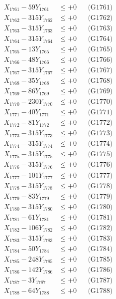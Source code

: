\documentclass[a4paper,10pt]{article}
\begin{document}
{\begin{align}
\allowbreak
X_{1761} - 59Y_{1761} &\leq +0 && \text{(G1761)} \\
X_{1762} - 315Y_{1762} &\leq +0 && \text{(G1762)} \\
X_{1763} - 315Y_{1763} &\leq +0 && \text{(G1763)} \\
X_{1764} - 315Y_{1764} &\leq +0 && \text{(G1764)} \\
X_{1765} - 13Y_{1765} &\leq +0 && \text{(G1765)} \\
X_{1766} - 48Y_{1766} &\leq +0 && \text{(G1766)} \\
X_{1767} - 315Y_{1767} &\leq +0 && \text{(G1767)} \\
X_{1768} - 35Y_{1768} &\leq +0 && \text{(G1768)} \\
X_{1769} - 86Y_{1769} &\leq +0 && \text{(G1769)} \\
X_{1770} - 230Y_{1770} &\leq +0 && \text{(G1770)} \\
\allowbreak
X_{1771} - 40Y_{1771} &\leq +0 && \text{(G1771)} \\
X_{1772} - 81Y_{1772} &\leq +0 && \text{(G1772)} \\
X_{1773} - 315Y_{1773} &\leq +0 && \text{(G1773)} \\
X_{1774} - 315Y_{1774} &\leq +0 && \text{(G1774)} \\
X_{1775} - 315Y_{1775} &\leq +0 && \text{(G1775)} \\
X_{1776} - 315Y_{1776} &\leq +0 && \text{(G1776)} \\
X_{1777} - 101Y_{1777} &\leq +0 && \text{(G1777)} \\
X_{1778} - 315Y_{1778} &\leq +0 && \text{(G1778)} \\
X_{1779} - 83Y_{1779} &\leq +0 && \text{(G1779)} \\
X_{1780} - 315Y_{1780} &\leq +0 && \text{(G1780)} \\
\allowbreak
X_{1781} - 61Y_{1781} &\leq +0 && \text{(G1781)} \\
X_{1782} - 106Y_{1782} &\leq +0 && \text{(G1782)} \\
X_{1783} - 315Y_{1783} &\leq +0 && \text{(G1783)} \\
X_{1784} - 50Y_{1784} &\leq +0 && \text{(G1784)} \\
X_{1785} - 248Y_{1785} &\leq +0 && \text{(G1785)} \\
X_{1786} - 142Y_{1786} &\leq +0 && \text{(G1786)} \\
X_{1787} - 3Y_{1787} &\leq +0 && \text{(G1787)} \\
X_{1788} - 64Y_{1788} &\leq +0 && \text{(G1788)} \\

\end{align}}
\end{document}
